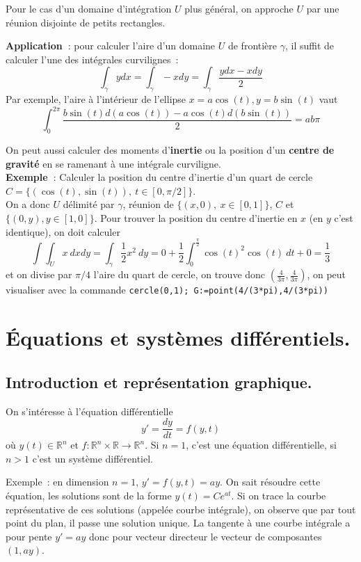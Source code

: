\documentclass[a4paper,11pt]{book}
\begin{document}
\begin{giacjshere}
Pour le cas d'un domaine d'int\'egration $U$ plus g\'en\'eral, on approche $U$
par une r\'eunion disjointe de petits rectangles.

{\bf Application~}: pour calculer l'aire d'un domaine $U$ de fronti\`ere
$\gamma$,  il suffit de
calculer l'une des int\'egrales curvilignes~:
$$ \int_\gamma y dx= \int_\gamma -x dy = \int_\gamma \frac{y dx - x
  dy}{2}$$
Par exemple, l'aire \`a l'int\'erieur de l'ellipse $x=a\cos(t),
y=b\sin(t)$ vaut
$$ \int_0^{2\pi} \frac{b \sin(t) d(a\cos(t)) - a\cos(t)
  d(b\sin(t))}{2} = ab\pi $$

On peut aussi calculer des moments d'{\bf inertie} 
ou la position d'un {\bf centre de gravit\'e}
en se ramenant \`a une int\'egrale curviligne.\\
{\bf Exemple~}: Calculer la position du centre d'inertie d'un quart
de cercle $C=\{(\cos(t),\sin(t)), \ t \in [0,\pi/2]\}$.\\
On a donc $U$ d\'elimit\'e par $\gamma$, r\'eunion de $\{(x,0), \ x
\in [0,1]\} $, $C$ et $\{(0,y), y \in [1,0]\}$.
Pour trouver la position du centre
d'inertie en $x$ (en $y$ c'est identique), on doit calculer
$$ \int \int_U x \ dx dy = \int_\gamma \frac{1}{2} x^2 \ dy
= 0 + \frac{1}{2} \int_0^{\frac{\pi}{2}} \cos(t)^2 \cos(t) \ dt + 0= \frac{1}{3}$$
et on divise par $\pi/4$ l'aire du quart de cercle, on trouve
donc $(\frac{4}{3\pi},\frac{4}{3\pi})$, on peut visualiser avec
la commande \verb|cercle(0,1); G:=point(4/(3*pi),4/(3*pi))|




\chapter{\'Equations et syst\`emes diff\'erentiels.}

\section{Introduction et repr\'esentation graphique.}
On s'int\'eresse \`a l'\'equation diff\'erentielle
\begin{equation} \label{eq:diff}
 y'=\frac{dy}{dt}=f(y,t)
\end{equation}
o\`u $y(t) \in \mathbb{R}^n$ et $f: \mathbb{R}^n \times \mathbb{R} \rightarrow \mathbb{R}^n$.
Si $n=1$, c'est une \'equation diff\'erentielle, si $n>1$ c'est
un syst\`eme diff\'erentiel.

Exemple~: en dimension $n=1$, $y'=f(y,t)=ay$. On sait r\'esoudre cette
\'equation, les solutions sont de la forme $y(t)=Ce^{at}$. Si on trace
la courbe repr\'esentative de ces solutions (appel\'ee
courbe int\'egrale), on observe que par
tout point du plan, il passe une solution unique. La tangente
\`a une courbe int\'egrale a pour pente $y'=ay$ donc pour
vecteur directeur le vecteur de composantes $(1,ay)$.


\end{giacjshere}
\end{document}
